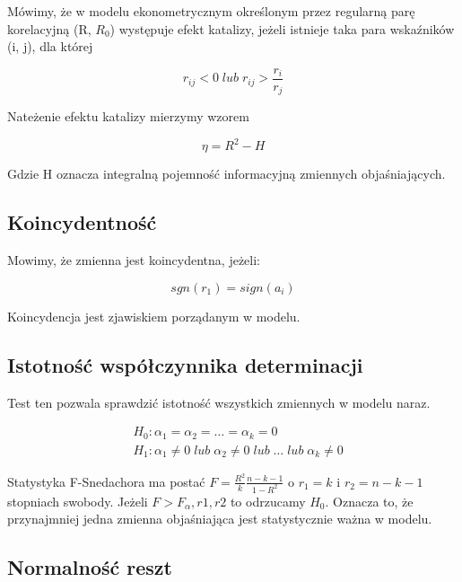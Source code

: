Mówimy, że w modelu ekonometrycznym określonym przez regularną
parę korelacyjną (R, \(R_0\)) występuje efekt katalizy, jeżeli istnieje taka
para wskaźników (i, j), dla której

\begin{equation}
    r_{ij} < 0 \; lub \; r_{ij}  > \frac{r_i}{r_j}
\end{equation}

Nateżenie efektu katalizy mierzymy wzorem

\[ \eta = R^2 - H \]

Gdzie H oznacza integralną pojemność informacyjną zmiennych objaśniających.

\subsection{Koincydentność}\label{subsec:koincydentność}

Mowimy, że zmienna jest koincydentna, jeżeli:

\begin{equation}
    sgn(r_1) = sign(a_i)
\end{equation}

Koincydencja jest zjawiskiem porządanym w modelu.

\subsection{Istotność współczynnika determinacji}\label{subsec:istotność-współczynnika-determinacji}

Test ten pozwala sprawdzić istotność wszystkich zmiennych w modelu naraz.

\begin{equation}
    \begin{split}
        &H_0: \alpha_1 = \alpha_2 = \dots = \alpha_k = 0 \\
        &H_1: \alpha_1 \ne 0 \; lub \; \alpha_2 \ne 0 \; lub \; \dots \; lub \; \alpha_k \ne 0
    \end{split}
\end{equation}

Statystyka F-Snedachora ma postać \(F = \frac{R^2}{k} \frac{n-k-1}{1-R^2}\) o \(r_1 = k\) i \(r_2 = n-k-1\) stopniach swobody.
Jeżeli \(F > F_\alpha,r1,r2 \) to odrzucamy \(H_0\).
Oznacza to, że przynajmniej jedna zmienna objaśniająca jest statystycznie ważna w modelu.

\subsection{Normalność reszt}\label{subsec:normalność-reszt}

